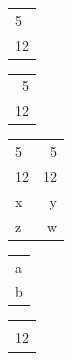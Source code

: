\documentclass{article}
\begin{document}
\begin{tabular}{l}\phantom{0}5\\12\end{tabular}

\begin{tabular}{r}5\phantom{0}\\12\end{tabular}

\begin{tabular}{l|r}5&5\\12&12\\\mathstrut\hfil x&y\\z&w\end{tabular}

\begin{tabular}{l}\vphantom{Xy}a\\b\end{tabular}

\begin{tabular}{l}\phantom{0}\\12\end{tabular}
\end{document}
